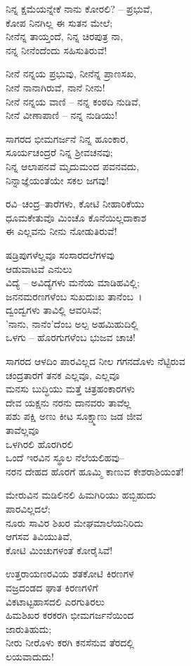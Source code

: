 ನಿನ್ನ ಕ್ಷಮೆಯನ್ನೇಕೆ ನಾನು ಕೋರಲಿ? – ಪ್ರಭುವೆ,\\ಕೋಪ ನಿನಗಿಲ್ಲ ಈ ಸುತನ ಮೇಲೆ;\\ನೀನೆನ್ನ ತಾಯ್ತಂದೆ, ನಿನ್ನ ಚಿರಪುತ್ರ ನಾ,\\ನನ್ನ ನೀನೆಂದೆಂದು ಸಹಿಸುತಿರುವೆ!

ನೀನೆ ನನ್ನಯ ಪ್ರಭುವು, ನೀನೆನ್ನ ಪ್ರಾಣಸಖ,\\ನೀನೆ ನಾನಾಗಿರುವೆ, ನಾನೆ ನೀನು!\\ನೀನೆ ನನ್ನಯ ವಾಣಿ – ನನ್ನ ಕಂಠದಿ ನುಡಿವೆ,\\ನೀನೆ ವೀಣಾಪಾಣಿ – ನನ್ನ ನುಡಿಯು!

ಸಾಗರದ ಭೀಮಗರ್ಜನೆ ನಿನ್ನ ಹೂಂಕಾರ,\\ಸೂರ್ಯಚಂದ್ರರೆ ನಿನ್ನ ಶ‍್ರೀವಚನವು;\\ನಿನ್ನ ಆಲಾಪನವೆ ಮೃದುಮಂದ ಪವನವದು,\\ನಿನ್ನಾಜ್ಞೆಯಂತೆಯೇ ಸಕಲ ಜಗವು!

ರವಿ–ಚಂದ್ರ–ತಾರೆಗಳು, ಕೋಟಿ ನೀಹಾರಿಕೆಯು\\ಧೂಮಕೇತುವೊ ಮಿಂಚೊ ಕೊನೆಯಿಲ್ಲದಾಕಾಶ\\ಈ ಎಲ್ಲವನು ನೀನು ನೋಡುತಿರುವೆ!

ಷಡ್ರಿಪುಗಳೆಲ್ಲವೂ ಸಂಸಾರದಲೆಗಳವು\\ಆಡುವಾಟವೆ ಎನುಲು\\ವಿದ್ಯೆ – ಅವಿದ್ಯೆಗಳು ಮನೆಯ ಮಾಡಿಹವಿಲ್ಲಿ;\\ಜನನಮರಣಗಳೆಂಬ ಸುಖದುಃಖ ತಾನೆಂಬ~।\\
 ದ್ವಂದ್ವಗಳು ತಾವಿಲ್ಲಿ ಆವರಿಸಿವೆ;\\'ನಾನು, ನಾನೆಂ'ದೆಂಬ ಅಲ್ಪ ಅಹಮಿಹುದಿಲ್ಲಿ\\ಒಳಗು – ಹೊರಗುಗಳೆಂಬ ಭುಜವ ಚಾಚಿ!

ಸಾಗರದ ಆಳದಿಂ ಪಾರವಿಲ್ಲದ ನೀಲ ಗಗನದೊಳು ನೆಟ್ಟಿರುವ\\ಚಂದ್ರತಾರಗೆ ತನಕ ಎಲ್ಲವೂ, ಎಲ್ಲವೂ\\ಮನಸು ಬುದ್ಧಿಯು ಮತ್ತೆ ಚಿತ್ರಹಂಕಾರಗಳು\\ದೇವ ಯಕ್ಷನು ನರನು ದಾನವರು ತಾವೆಲ್ಲ\\ಪಶು ಪಕ್ಷಿ ಅಣು ಕೀಟ ಸೂಕ್ಷ್ಮಾಣು ಜಡ ಜೀವ\\ತಾವೆಲ್ಲವೂ\\ಒಳಗಿರಲಿ ಹೊರಗಿರಲಿ\\ಒಂದೆ ಇರವಿನ ಸ್ಥೂಲ ನೆಲೆಯಲಿಹವು–\\ನರನ ದೇಹದ ಹೊರಗೆ ಹೂಮ್ಮಿ ಕಾಣುವ ಕೇಶರಾಶಿಯಂತೆ!

ಮೇರುವಿನ ಮಡಿಲಿನಲಿ ಹಿಮಗಿರಿಯು ಹಬ್ಬಿಹುದು\\ಪಾರವಿಲ್ಲದಲೆ;\\ನೂರು ಸಾವಿರ ಶಿಖರ ಮೇಘಮಾಲೆಯನಿರಿದು\\ಆಗಸವ ತಿವಿಯುತಿವೆ,\\ಕೋಟಿ ಮಿಂಚುಗಳಂತೆ ಕೋರೈಸಿವೆ!

ಉತ್ತರಾಯಣರವಿಯ ಶತಕೋಟಿ ಕಿರಣಗಳ\\ವಜ್ರದಂಡದ ಘಾತ ಕಿರಣಗಳಿಗೆ\\ವಿಕಟಾಟ್ಟಹಾಸದಲಿ ಎರಗುತಿರಲು\\ಹಿಮಶಿಖರ ಕರಕರಗಿ ಭೀಮಗರ್ಜನೆಯಿಂದ\\ಜಾರುತಿಹುದು;\\ನೀರು ನೀರೊಳು ಕರಗಿ ಕನಸೆನುವ ತೆರದಲ್ಲಿ\\ಲಯವಾದುದು!

